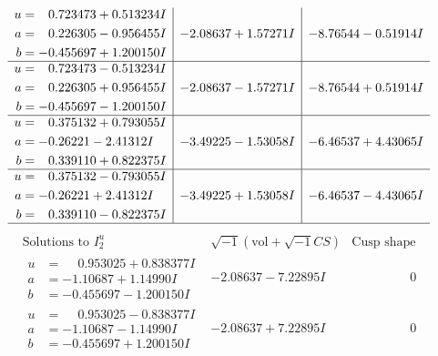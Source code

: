 \documentclass[1p]{elsarticle_modified}
\theoremstyle{definition}
\newcommand{\I}{\sqrt{-1}}
\begin{document}
$$\begin{array}{c|c|c}
\begin{aligned}
u &= \phantom{-}0.723473 + 0.513234 I \\
a &= \phantom{-}0.226305 - 0.956455 I \\
b &= -0.455697 + 1.200150 I\end{aligned}
 & -2.08637 + 1.57271 I & -8.76544 - 0.51914 I \\ \hline\begin{aligned}
u &= \phantom{-}0.723473 - 0.513234 I \\
a &= \phantom{-}0.226305 + 0.956455 I \\
b &= -0.455697 - 1.200150 I\end{aligned}
 & -2.08637 - 1.57271 I & -8.76544 + 0.51914 I \\ \hline\begin{aligned}
u &= \phantom{-}0.375132 + 0.793055 I \\
a &= -0.26221 - 2.41312 I \\
b &= \phantom{-}0.339110 + 0.822375 I\end{aligned}
 & -3.49225 - 1.53058 I & -6.46537 + 4.43065 I \\ \hline\begin{aligned}
u &= \phantom{-}0.375132 - 0.793055 I \\
a &= -0.26221 + 2.41312 I \\
b &= \phantom{-}0.339110 - 0.822375 I\end{aligned}
 & -3.49225 + 1.53058 I & -6.46537 - 4.43065 I\\
 \hline 
 \end{array}$$\newpage$$\begin{array}{c|c|c}  
\text{Solutions to }I^u_{2}& \I (\text{vol} + \sqrt{-1}CS) & \text{Cusp shape}\\
 \hline 
\begin{aligned}
u &= \phantom{-}0.953025 + 0.838377 I \\
a &= -1.10687 + 1.14990 I \\
b &= -0.455697 - 1.200150 I\end{aligned}
 & -2.08637 - 7.22895 I & \phantom{-0.000000 } 0 \\ \hline\begin{aligned}
u &= \phantom{-}0.953025 - 0.838377 I \\
a &= -1.10687 - 1.14990 I \\
b &= -0.455697 + 1.200150 I\end{aligned}
 & -2.08637 + 7.22895 I & \phantom{-0.000000 } 0 \\ \hline\begin{aligned}

\end{aligned}
\end{array}$$
\end{document}
